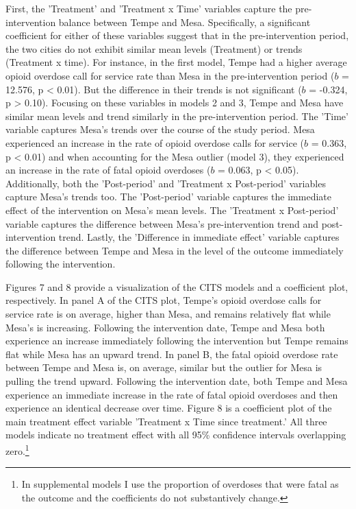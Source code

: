 First, the 'Treatment' and 'Treatment x Time' variables capture the pre-intervention balance between Tempe and Mesa. Specifically, a significant coefficient for either of these variables suggest that in the pre-intervention period, the two cities do not exhibit similar mean levels (Treatment) or trends (Treatment x time).  For instance, in the first model, Tempe had a higher average opioid overdose call for service rate than Mesa in the pre-intervention period (\(b\) = 12.576, p < 0.01). But the difference in their trends is not significant (\(b\) = -0.324, p > 0.10). Focusing on these variables in models 2 and 3, Tempe and Mesa have similar mean levels and trend similarly in the pre-intervention period. The 'Time' variable captures Mesa's trends over the course of the study period. Mesa experienced an increase in the rate of opioid overdose calls for service (\(b\) = 0.363, p < 0.01) and when accounting for the Mesa outlier (model 3), they experienced an increase in the rate of fatal opioid overdoses (\(b\) = 0.063, p < 0.05). Additionally, both the 'Post-period' and 'Treatment x Post-period' variables capture Mesa's trends too. The 'Post-period' variable captures the immediate effect of the intervention on Mesa's mean levels. The 'Treatment x Post-period' variable captures the difference between Mesa's pre-intervention trend and post-intervention trend. Lastly, the 'Difference in immediate effect' variable captures the difference between Tempe and Mesa in the level of the outcome immediately following the intervention.

Figures 7 and 8 provide a visualization of the CITS models and a coefficient plot, respectively. In panel A of the CITS plot, Tempe's opioid overdose calls for service rate is on average, higher than Mesa, and remains relatively flat while Mesa's is increasing. Following the intervention date, Tempe and Mesa both experience an increase immediately following the intervention but Tempe remains flat while Mesa has an upward trend. In panel B, the fatal opioid overdose rate between Tempe and Mesa is, on average, similar but the outlier for Mesa is pulling the trend upward. Following the intervention date, both Tempe and Mesa experience an immediate increase in the rate of fatal opioid overdoses and then experience an identical decrease over time. Figure 8 is a coefficient plot of the main treatment effect variable 'Treatment x Time since treatment.' All three models indicate no treatment effect with all 95\% confidence intervals overlapping zero.\footnote{In supplemental models I use the proportion of overdoses that were fatal as the outcome and the coefficients do not substantively change.}


